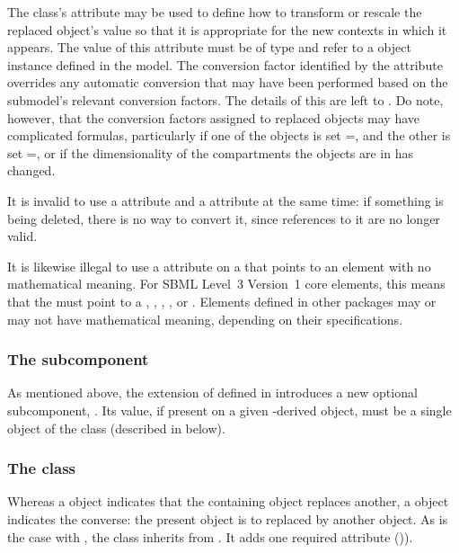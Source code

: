 The \ReplacedElement class's  attribute may be used to
define how to transform or rescale the replaced object's value so that
it is appropriate for the new contexts in which it appears.  The value
of this attribute must be of type  and refer to a
\Parameter object instance defined in the model.  The conversion factor
identified by the  attribute overrides any
automatic conversion that may have been performed based on the
submodel's relevant conversion factors.  The details of this are left to
.  Do note, however, that the conversion 
factors assigned to replaced \Species objects may have complicated formulas,
particularly if one of the objects is set =,
and the other is set =, or if 
the dimensionality of the compartments the objects are in has changed.

It is invalid to use a 
attribute and a  attribute at the same time:  if something
is being deleted, there is no way to convert it, since references to it are
no longer valid.

It is likewise illegal to use a  attribute on a 
\ReplacedElement that points to an element with no mathematical meaning.  For
SBML Level~3 Version~1 core elements, this means that the \ReplacedElement 
must point to a \Compartment, \Parameter, \Reaction, \Species, or \SpeciesReference.
Elements defined in other packages may or may not have mathematical meaning, depending
on their specifications.

\subsubsection{The \fixttspace{} subcomponent}

As mentioned above, the extension of \SBase defined in
 introduces a new optional subcomponent,
.  Its value, if present on a given \SBase-derived
object, must be a single object of the \ReplacedBy class (described in
 below).


\subsubsection{The \ReplacedBy class}
\label{replacedby-class}

Whereas a \ReplacedElement object indicates that the containing object
replaces another, a \ReplacedBy object indicates the converse: the
present object is to replaced by another object.  As is the case with
\ReplacedElement, the \ReplacedBy class inherits from \SBaseRef.  It
adds one required attribute ()).

